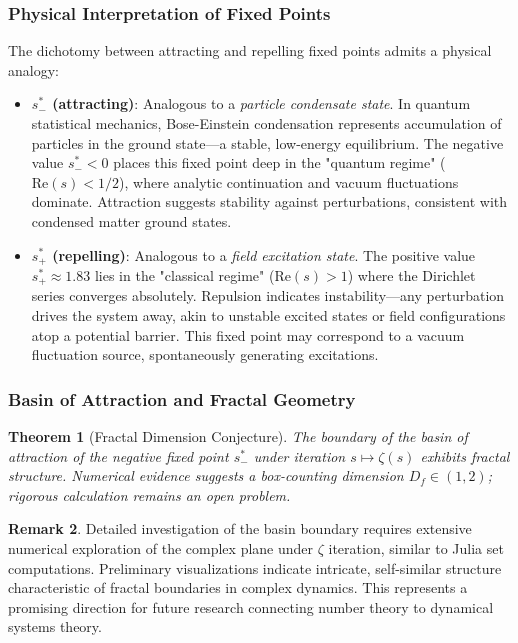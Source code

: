 \documentclass[12pt]{article}
\theoremstyle{plain}
\newtheorem{theorem}{Theorem}[section]
\theoremstyle{definition}
\newtheorem{remark}[theorem]{Remark}
\begin{document}
\subsubsection{Physical Interpretation of Fixed Points}

The dichotomy between attracting and repelling fixed points admits a physical analogy:

\begin{itemize}
\item \textbf{$s_-^*$ (attracting)}: Analogous to a \emph{particle condensate state}. In quantum statistical mechanics, Bose-Einstein condensation represents accumulation of particles in the ground state—a stable, low-energy equilibrium. The negative value $s_-^* < 0$ places this fixed point deep in the "quantum regime" ($\text{Re}(s) < 1/2$), where analytic continuation and vacuum fluctuations dominate. Attraction suggests stability against perturbations, consistent with condensed matter ground states.

\item \textbf{$s_+^*$ (repelling)}: Analogous to a \emph{field excitation state}. The positive value $s_+^* \approx 1.83$ lies in the "classical regime" ($\text{Re}(s) > 1$) where the Dirichlet series converges absolutely. Repulsion indicates instability—any perturbation drives the system away, akin to unstable excited states or field configurations atop a potential barrier. This fixed point may correspond to a vacuum fluctuation source, spontaneously generating excitations.
\end{itemize}

\subsubsection{Basin of Attraction and Fractal Geometry}

\begin{theorem}[Fractal Dimension Conjecture]\label{thm:fractal_dimension}
The boundary of the basin of attraction of the negative fixed point $s_-^*$ under iteration $s \mapsto \zeta(s)$ exhibits fractal structure. Numerical evidence suggests a box-counting dimension $D_f \in (1, 2)$; rigorous calculation remains an open problem.
\end{theorem}

\begin{remark}
Detailed investigation of the basin boundary requires extensive numerical exploration of the complex plane under $\zeta$ iteration, similar to Julia set computations. Preliminary visualizations indicate intricate, self-similar structure characteristic of fractal boundaries in complex dynamics. This represents a promising direction for future research connecting number theory to dynamical systems theory.
\end{remark}
\end{document}
